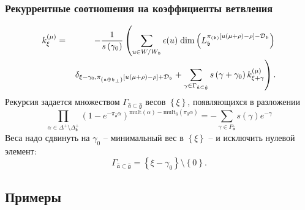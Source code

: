 \documentclass[pdftex]{beamer}
\newcommand{\gfh}{\hat{\mathfrak{g}}}
\newcommand{\afh}{\hat{\mathfrak{a}}}
\theoremstyle{definition} \newtheorem{Def}{Определение}
\begin{document}
\begin{frame}
  \frametitle{Рекуррентные соотношения на коэффициенты ветвления}
  
\begin{eqnarray*}
k_{\xi }^{\left( \mu \right) } &=&-\frac{1}{s\left( \gamma _{0}\right) }%
\left( \sum_{u\in W/W_{\frak{b}}}\epsilon (u)\;\mathrm{dim}\left( L_{\mathfrak{b}}^{\pi
_{\left( \frak{b}\right) }\left[ u(\mu +\rho )-\rho \right] -\mathcal{D}_{%
\frak{b}}}\right) \right.\\
&&\left.\delta _{\xi -\gamma _{0},\pi _{\left( \frak{a\oplus h}%
_{\perp}\right) }\left[ u(\mu +\rho )-\rho \right] +\mathcal{D}_{\frak{b}%
}}+
\sum_{\gamma \in \Gamma _{\afh\subset \gfh}}s\left( \gamma
+\gamma _{0}\right) k_{\xi +\gamma }^{\left( \mu \right) }\right) \text{.}
\end{eqnarray*}
Рекурсия задается множеством $\Gamma _{\afh\subset \gfh}$ весов $\left\{\xi\right\}$, появляющихся в разложении
\begin{equation*}
\prod_{\alpha \in \Delta ^{+}\setminus \Delta _{\mathfrak{b} }^{+}}\left( 1-e^{-\pi
_{\afh}\alpha }\right) ^{\mathrm{mult}(\alpha )-\mathrm{mult}_{\afh}(\pi _{\afh}\alpha )}=-\sum_{\gamma \in P_{\afh}}s(\gamma )e^{-\gamma }
\end{equation*}
Веса надо сдвинуть на  $\gamma _{0}$ -- минимальный вес в  $\left\{ \xi\right\} $ -- и исключить нулевой элемент:
\begin{equation*}
\Gamma _{\afh\subset \gfh}=\left\{ \xi -\gamma
_{0}\right\} \setminus \left\{ 0\right\} .
\end{equation*}
\end{frame}
\subsection{Примеры}
\end{document}
